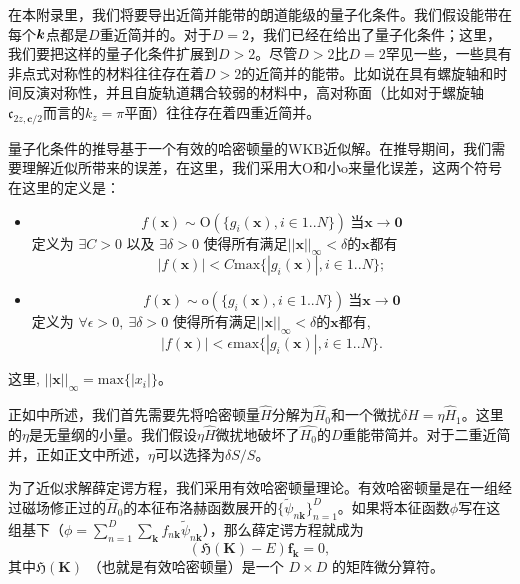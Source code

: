 在本附录里，我们将要导出近简并能带的朗道能级的量子化条件。我们假设能带在每个$\boldsymbol{k}$点都是$D$重近简并的。对于$D=2$，我们已经在给出了量子化条件；这里，我们要把这样的量子化条件扩展到$D>2$。尽管$D>2$比$D=2$罕见一些，一些具有非点式对称性的材料往往存在着$D>2$的近简并的能带。比如说在具有螺旋轴和时间反演对称性，并且自旋轨道耦合较弱的材料中，高对称面（比如对于螺旋轴$\mathfrak{c}_{2z,\boldsymbol{c}/2}$而言的$k_z=\pi$平面）往往存在着四重近简并。

量子化条件的推导基于一个有效的哈密顿量的WKB近似解。在推导期间，我们需要理解近似所带来的误差，在这里，我们采用大O和小o来量化误差，这两个符号在这里的定义是： 
\begin{itemize}
    \item 
    \begin{equation}
        f(\boldsymbol{x})\sim\text{O}(\{g_i(\boldsymbol{x}), i\in 1..N\}) ~ 当 \boldsymbol{x}\to\boldsymbol{0}
    \end{equation}
    定义为 $\exists C>0$ 以及 $\exists \delta>0$ 使得所有满足$||\boldsymbol{x}||_\infty<\delta$的$\boldsymbol{x}$都有
    \begin{equation}
        |f(\boldsymbol{x})|<C\text{max}\{|g_i(\boldsymbol{x})|, i\in 1..N\};
    \end{equation}
    \item 
    \begin{equation}
        f(\boldsymbol{x})\sim\text{o}(\{g_i(\boldsymbol{x}), i\in 1..N\}) ~ 当 \boldsymbol{x}\to\boldsymbol{0}
    \end{equation}
    定义为 $\forall \epsilon>0,~\exists \delta>0$ 使得所有满足$||\boldsymbol{x}||_\infty<\delta$的$\boldsymbol{x}$都有,
    \begin{equation}
        |f(\boldsymbol{x})|<\epsilon\text{max}\{|g_i(\boldsymbol{x})|, i\in 1..N\}.
    \end{equation}
\end{itemize}
这里, $||\boldsymbol{x}||_\infty=\text{max}\{|x_i|\}$。

正如中所述，我们首先需要先将哈密顿量$\hat{H}$分解为$\hat{H}_0$和一个微扰$\delta\hat{H}=\eta\hat{H}_1$。这里的$\eta$是无量纲的小量。我们假设$\eta\hat{H}$微扰地破坏了$\hat{H_0}$的$D$重能带简并。对于二重近简并，正如正文中所述，$\eta$可以选择为$\delta S/S$。

为了近似求解薛定谔方程，我们采用有效哈密顿量理论\cite{rotheffham,100p}。有效哈密顿量是在一组经过磁场修正过的$\hat{H}_0$的本征布洛赫函数展开的\cite{rotheffham}$\{\tilde{\psi}_{n\boldsymbol{k}}\}_{n=1}^D$。如果将本征函数$\phi$写在这组基下（$\phi=\sum_{n=1}^D\sum_{\boldsymbol{k}}f_{n\boldsymbol{k}}\tilde{\psi}_{n\boldsymbol{k}}$），那么薛定谔方程就成为
\begin{equation}
(\mathfrak{H}(\boldsymbol{K})-E)\boldsymbol{f}_{\boldsymbol{k}}=0,\label{eq:schrodinger}
\end{equation}
其中$\mathfrak{H}(\boldsymbol{K})$ （也就是有效哈密顿量）是一个 $D\times D$ 的矩阵微分算符。 

